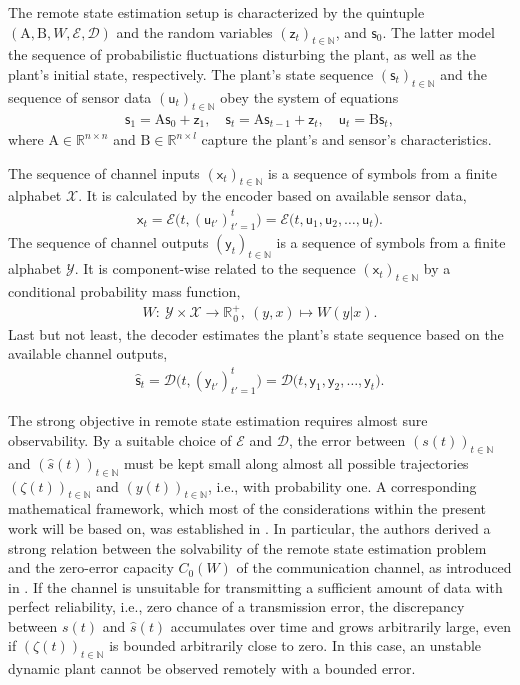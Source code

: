 \documentclass[conference]{IEEEtran}
\newcommand{\rx}{\mathsf{x}}
\newcommand{\ry}{\mathsf{y}}
\newcommand{\rs}{\mathsf{s}}
\newcommand{\rz}{\mathsf{z}}
\newcommand{\ru}{\mathsf{u}}
\def\E{{\mathcal E}}
\def\D{{\mathcal D}}
\def\X{{\mathcal X}}
\def\Y{{\mathcal Y}}
\def\NN{{\mathbb N}}
\def\RR{{\mathbb R}}
\def\mA{\bm{\mathrm{A}}}
\def\mB{\bm{\mathrm{B}}}
\begin{document}
	The remote state estimation setup is characterized by the quintuple \((\mA,\mB,W,\E,\D)\) and the random variables \((\rz_t)_{t\in\NN}\), and \(\rs_{0}\). 
	The latter model the sequence of probabilistic fluctuations disturbing the plant, as well as the plant's initial state, respectively. The plant's state sequence \((\rs_t)_{t\in\NN}\) 
	and the sequence of sensor data \((\ru_t)_{t\in\NN}\) obey the system of equations
	\begin{align*}	\rs_1    = \mA \rs_0 + \rz_1, \quad 
					\rs_t    = \mA \rs_{t-1} + \rz_t,\quad 
					\ru_t    = \mB \rs_t,
	\end{align*}
	where \(\mA\in\RR^{n\times n}\) and \(\mB\in\RR^{n\times l}\) capture the plant's and sensor's characteristics. 

	The sequence of channel inputs \((\rx_t)_{t\in\NN}\) is a sequence
	of symbols from a finite alphabet \(\X\). It is calculated by the encoder based on available sensor data,
	\begin{align*}	\rx_t   = \E \big(t, (\ru_{t'})_{t'=1}^{t}\big) 
							= \E\big(t, \ru_1,\ru_2,\ldots,\ru_t\big).
	\end{align*} 
	The sequence of channel outputs \((\ry_t)_{t\in\NN}\) is a sequence
	of symbols from a finite alphabet \(\Y\). It is component-wise related to the sequence \((\rx_t)_{t\in\NN}\) by a conditional probability mass function,
	\begin{align*}	W :~ \Y \times \X \rightarrow \RR_{\hspace{1pt}0}^+,~(y,x) \mapsto W(y|x).
	\end{align*}
	Last but not least, the decoder estimates the plant's state sequence based on the available channel outputs,
	\begin{align*}	\hat{\rs}_t  	= \D \big(t, (\ry_{t'})_{t'=1}^{t}\big)  
									= \D\big(t,\ry_1,\ry_2,\ldots,\ry_t\big).
	\end{align*}

	The strong objective in remote state estimation requires almost sure observability. By a suitable choice of \(\E\) and \(\D\), the error between \((s(t))_{t\in\NN}\)
	and \((\hat{s}(t))_{t\in\NN}\) must be kept small along almost all possible trajectories \((\zeta(t))_{t\in\NN}\) and \((y(t))_{t\in\NN}\), i.e., with probability one.
	A corresponding mathematical framework, which most of the considerations within the present work will be based on, was established in \cite{MS07}.
	In particular, the authors derived a strong relation between the solvability of the remote state estimation problem and the zero-error capacity \(C_0(W)\) of the 
	communication channel, as introduced in \cite{Sh56}. If the channel is unsuitable for transmitting a sufficient amount of data with perfect reliability, i.e., zero 
	chance of a transmission error, the discrepancy between \(s(t)\) and \(\hat{s}(t)\) accumulates over time and grows arbitrarily large, even if \((\zeta(t))_{t\in\NN}\) 
	is bounded arbitrarily close to zero. In this case, an unstable dynamic plant cannot be observed remotely with a bounded error. 
\end{document}
